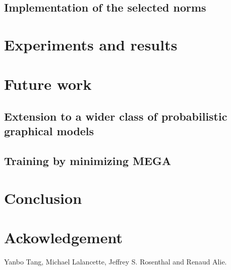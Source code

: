 \documentclass{article}
\begin{document}
\subsection{Implementation of the selected norms}



\section{Experiments and results} \label{expe}

\section{Future work} \label{fuwo}
\subsection{Extension to a wider class of probabilistic graphical models}
\subsection{Training by minimizing MEGA}

\section{Conclusion} \label{conc}

\section*{Ackowledgement}

Yanbo Tang, Michael Lalancette, Jeffrey S. Rosenthal and Renaud Alie.

\pagebreak


\bigskip
\end{document}
